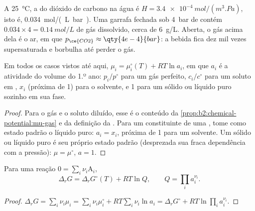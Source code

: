 \begin{example}\label{ex:b2:chemical-potential:soda}
A \qty{25}{\celsius}, a  do dióxido de carbono na água é $H =
\qty{3.4e-4}{mol/(m^3.Pa)}$, isto é, \qty{0.034}{mol/(L.bar)}. Uma garrafa
fechada sob \qty{4}{bar} de  contém $0.034 \times 4 =
\qty{0.14}{mol/L}$ de gás dissolvido, cerca de \qty{6}{g/L}. Aberta, o gás
acima dela é o ar, em que $p_{\ce{CO2}} \approx \qty{4e-4}{bar}$: a bebida
fica dez mil vezes supersaturada e borbulha até perder o gás.
\end{example}

\begin{proposition}\label{prop:b2:chemical-potential:activity}
Em todos os casos vistos até aqui, $\mu_i = \mu_i^\circ(T) + RT\ln a_i$, em que $a_i$
é a atividade do volume do 1.º ano: $p_i/p^\circ$ para um gás perfeito,
$c_i/c^\circ$ para um soluto em , $x_i$ (próxima de 1)
para o solvente, e 1 para um sólido ou líquido puro sozinho em sua fase.
\end{proposition}

\begin{proof}
Para o gás e o soluto diluído, esse é o conteúdo da
\cref{prop:b2:chemical-potential:mu-gas} e da definição da . Para um constituinte de uma , tome como estado padrão
o líquido puro: $a_i = x_i$, próxima de 1 para um solvente. Um sólido ou
líquido puro é seu próprio estado padrão (desprezada sua fraca dependência
com a pressão): $\mu = \mu^\circ$, $a = 1$.
\end{proof}

\begin{proposition}\label{prop:b2:chemical-potential:delta-g-q}
Para uma reação $0 = \sum_i\nu_i\mathrm A_i$,
\[
  \Delta_r G = \Delta_r G^\circ(T) + RT\ln Q, \qquad Q = \prod_i a_i^{\nu_i} .
\]
\end{proposition}

\begin{proof}
$\Delta_r G = \sum_i\nu_i\mu_i = \sum_i\nu_i\mu_i^\circ + RT\sum_i\nu_i\ln a_i =
\Delta_r G^\circ + RT\ln\prod_i a_i^{\nu_i}$.
\end{proof}

